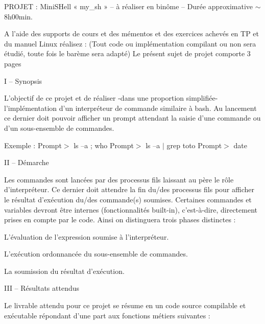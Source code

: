 P\+R\+O\+J\+ET \+: Mini\+S\+Hell « my\+\_\+sh » – à réaliser en binôme – Durée approximative $\sim$ 8h00min.

A l’aide des supports de cours et des mémentos et des exercices achevés en TP et du manuel Linux réalisez \+: (Tout code ou implémentation compilant ou non sera étudié, toute fois le barème sera adapté) Le présent sujet de projet comporte 3 pages

I – Synopsis

L’objectif de ce projet et de réaliser -\/dans une proportion simplifiée-\/ l’implémentation d’un interpréteur de commande similaire à bash. Au lancement ce dernier doit pouvoir afficher un prompt attendant la saisie d’une commande ou d’un sous-\/ensemble de commandes.

Exemple \+: Prompt$>$ ls –a ; who Prompt$>$ ls –a $\vert$ grep toto Prompt$>$ date

II – Démarche

Les commandes sont lancées par des processus fils laissant au père le rôle d’interpréteur. Ce dernier doit attendre la fin du/des processus fils pour afficher le résultat d’exécution du/des commande(s) soumises. Certaines commandes et variables devront être internes (fonctionnalités built-\/in), c’est-\/à-\/dire, directement prises en compte par le code. Ainsi on distinguera trois phases distinctes \+:


\begin{DoxyEnumerate}
\item L’évaluation de l’expression soumise à l’interpréteur. ~\newline

\item L’exécution ordonnancée du sous-\/ensemble de commandes. ~\newline

\item La soumission du résultat d’exécution. ~\newline

\end{DoxyEnumerate}

I\+II – Résultats attendus

Le livrable attendu pour ce projet se résume en un code source compilable et exécutable répondant d’une part aux fonctions métiers suivantes \+:

